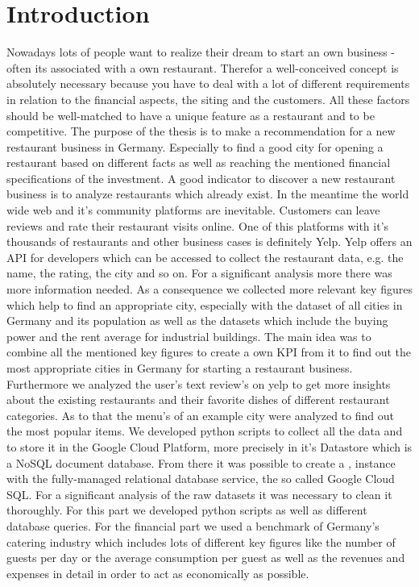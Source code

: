 \section{Introduction}
\label{sec:introduction}
Nowadays lots of people want to realize their dream to start an own business - often its associated with a own restaurant. Therefor a well-conceived concept is absolutely necessary because you have to deal with a lot of different requirements in relation to the financial aspects, the siting and the customers. All these factors should be well-matched to have a unique feature as a restaurant and to be competitive. \newline
The purpose of the thesis is to make a recommendation for a new restaurant business in Germany. Especially to find a good city for opening a restaurant based on different facts as well as reaching the mentioned financial specifications of the investment.
A good indicator to discover a new restaurant business is to analyze restaurants which already exist. In the meantime the world wide web and it's community platforms are inevitable. Customers can leave reviews and rate their restaurant visits online. One of this platforms with it's thousands of restaurants and other business cases is definitely Yelp. Yelp offers an API for developers which can be accessed to collect the restaurant data, e.g. the name, the rating, the city and so on. For a significant analysis more there was more information needed. As a consequence we collected more relevant key figures which help to find an appropriate city, especially with the dataset of all cities in Germany and its population as well as the datasets which include the buying power and the rent average for industrial buildings. The main idea was to combine all the mentioned key figures to create a own \ac{KPI} from it to find out the most appropriate cities  in Germany for starting a restaurant business. Furthermore we analyzed the user's text review's on yelp to get more insights about the existing restaurants and their favorite dishes of different restaurant categories. As to that the menu's of an example city were analyzed to find out the most popular items. We developed python scripts to collect all the data and to store it in the Google Cloud Platform, more precisely in it's Datastore which is a NoSQL document database. From there it was possible to create a \pg{}‚ instance with the fully-managed relational database service, the so called Google Cloud SQL. For a significant analysis of the raw datasets it was necessary to clean it thoroughly. For this part we developed python scripts as well as different database queries. \newline For the financial part we used a benchmark of Germany's catering industry which includes lots of different key figures like the number of guests per day or the average consumption per guest as well as the revenues and expenses in detail in order to act as economically as possible.